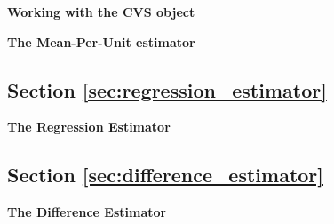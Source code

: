 \begin{exercise}
\label{ex:working_with_objects}

\textbf{Working with the CVS object}









\end{exercise}

\begin{exercise}
\label{ex:mpu_estimator}

\textbf{The Mean-Per-Unit estimator}






\end{exercise}

\subsection{Section \ref{sec:regression_estimator}}

\begin{exercise}
\label{ex:regression_estimator}

\textbf{The Regression Estimator}





\end{exercise}

\subsection{Section \ref{sec:difference_estimator}}

\begin{exercise}
\label{ex:difference_estimator}

\textbf{The Difference Estimator}





\end{exercise}

